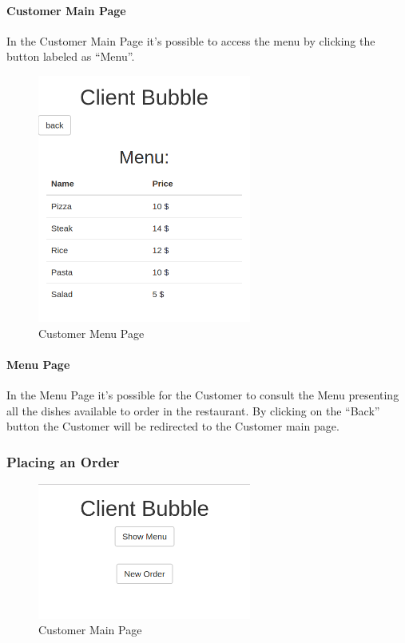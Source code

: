 \paragraph{Customer Main Page}
In the Customer Main Page it's possible to access the menu by clicking the button labeled as ``Menu''.
\begin{figure}[H]
	\centering
	\includegraphics[width=7cm]{../../documenti/UserManualDemo/demo_screens/client_menu.png}
	\caption{Customer Menu Page}
\end{figure}
\paragraph{Menu Page }
In the Menu Page it's possible for the Customer to consult the Menu presenting all the dishes available to order in the restaurant.
By clicking on the ``Back'' button the Customer will be redirected to the Customer main page.

\subsubsection{Placing an Order}
\begin{figure}[H]
	\centering
	\includegraphics[width=7cm]{../../documenti/UserManualDemo/demo_screens/client_main.png}
	\caption{Customer Main Page}
\end{figure}
